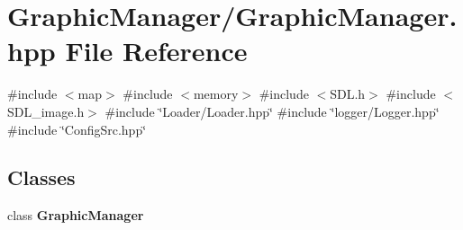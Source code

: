 \section{Graphic\+Manager/\+Graphic\+Manager.hpp File Reference}
\label{_graphic_manager_8hpp}
{\ttfamily \#include $<$map$>$}\newline
{\ttfamily \#include $<$memory$>$}\newline
{\ttfamily \#include $<$S\+D\+L.\+h$>$}\newline
{\ttfamily \#include $<$S\+D\+L\+\_\+image.\+h$>$}\newline
{\ttfamily \#include \char`\"{}Loader/\+Loader.\+hpp\char`\"{}}\newline
{\ttfamily \#include \char`\"{}logger/\+Logger.\+hpp\char`\"{}}\newline
{\ttfamily \#include \char`\"{}Config\+Src.\+hpp\char`\"{}}\newline
\subsection*{Classes}
\begin{DoxyCompactItemize}
\item 
class \textbf{ Graphic\+Manager}
\end{DoxyCompactItemize}
